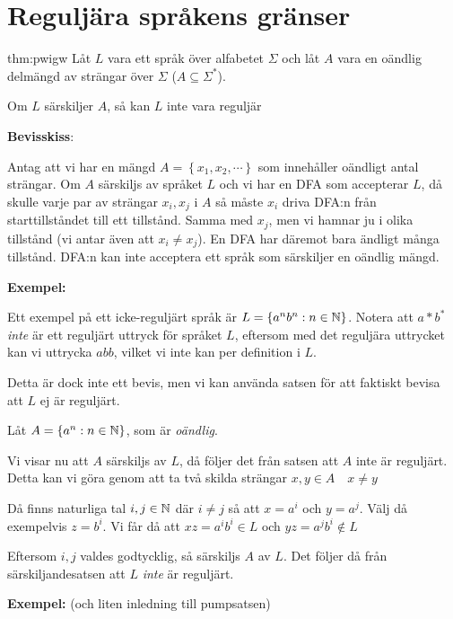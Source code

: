 \section{Reguljära språkens gränser}\par
\begin{theo}[Särskiljandesatsen]{thm:pwigw}
  Låt $L$ vara ett språk över alfabetet $\Sigma$ och låt $A$ vara en oändlig delmängd av strängar över $\Sigma$ ($A\subseteq\Sigma^*$).\par
  \noindent Om $L$ särskiljer $A$, så kan $L$ inte vara reguljär
\end{theo}
\par\bigskip
\noindent\textbf{Bevisskiss}:\par
\noindent Antag att vi har en mängd $A = \left\{x_1,x_2,\cdots\right\}$ som innehåller oändligt antal strängar. Om $A$ särskiljs av språket $L$ och vi har en DFA som accepterar $L$, då skulle varje par av strängar $x_i, x_j$ i $A$ så måste $x_i$ driva DFA:n från starttillståndet till ett tillstånd. Samma med $x_j$, men vi hamnar ju i olika tillstånd (vi antar även att $x_i\neq x_j$). En DFA har däremot bara ändligt många tillstånd. DFA:n kan inte acceptera ett språk som särskiljer en oändlig mängd.
\par\bigskip
\noindent\textbf{Exempel:}\par
\noindent Ett exempel på ett icke-reguljärt språk är $L = \left\{a^nb^n:n\in\mathbb{N}\right\}$. Notera att $a*b^*$ \textit{inte} är ett reguljärt uttryck för språket $L$, eftersom med det reguljära uttrycket kan vi uttrycka $abb$, vilket vi inte kan per definition i $L$.\par
\noindent Detta är dock inte ett bevis, men vi kan använda satsen för att faktiskt bevisa att $L$ ej är reguljärt.\par
\noindent Låt $A = \left\{a^n:n\in\mathbb{N}\right\}$, som är \textit{oändlig}.\par
\noindent Vi visar nu att $A$ särskiljs av $L$, då följer det från satsen att $A$ inte är reguljärt. Detta kan vi göra genom att ta två skilda strängar $x,y\in A\quad x\neq y$\par
\noindent Då finns naturliga tal $i,j\in\mathbb{N}$ där $i\neq j$ så att $x=a^i$ och $y=a^j$. Välj då exempelvis $z=b^i$. Vi får då att $xz=a^ib^i\in L$ och $yz = a^jb^i\notin L$\par
\noindent Eftersom $i,j$ valdes godtycklig, så särskiljs $A$ av $L$. Det följer då från särskiljandesatsen att $L$ \textit{inte} är reguljärt.
\par\bigskip
\noindent\textbf{Exempel:} (och liten inledning till pumpsatsen)\par
